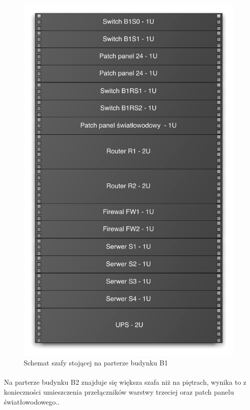 \begin{figure}[H]
  \begin{center}
    \includegraphics[width=\textwidth]{img/s/szafa-b1.pdf}
    \caption{Schemat szafy stojącej na parterze budynku B1}
  \end{center}
\end{figure}

\paragraph{}
Na parterze budynku B2 znajduje się większa szafa niż na piętrach, wynika to z konieczności umieszczenia przełączników warstwy trzeciej oraz patch panelu światłowodowego..

